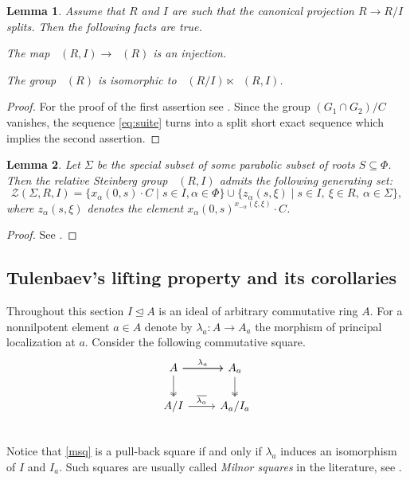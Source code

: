 \documentclass[oneside,12pt]{amsart}
\numberwithin{equation}{section}
\newtheorem{lem}{Lemma}
\numberwithin{lem}{section}
\theoremstyle{definition}
\theoremstyle{remark}
\DeclareMathOperator{\St}{St^G}
\begin{document}
\begin{lem}
 Assume that $R$ and $I$ are such that the canonical projection $ R \to R/I $ splits.
 Then the following facts are true.
 \begin{lemlist}
   \item \label{item:st-inj} The map $\St(R, I) \rightarrow \St(R)$ is an injection.
   \item \label{item:st-semi} The group $\St(R)$ is isomorphic to $\St(R/I) \ltimes \St(R, I)$.
 \end{lemlist}
\end{lem}
\begin{proof}
 For the proof of the first assertion see \cite[Lemma~8]{S15}.
 Since the group $(G_1 \cap G_2)/C$ vanishes, the sequence \eqref{eq:suite} turns into a split short exact sequence which implies the second assertion.
\end{proof}

\begin{lem} \label{lem:Zgen}
 Let $\Sigma$ be the special subset of some parabolic subset of roots $S \subseteq \Phi$.
 Then the relative Steinberg group $\St(R, I)$ admits the following generating set:
 \[ \mathcal{Z}(\Sigma, R, I) =  \{ x_\alpha(0,s) \cdot C \mid s\in I, \alpha \in \Phi \} \cup \{ z_\alpha(s, \xi) \mid s\in I, \ \xi \in R, \ \alpha \in \Sigma\},\]
 where $z_\alpha(s, \xi)$ denotes the element $x_\alpha(0, s)^{x_{-\alpha}(\xi, \xi)} \cdot C$.
\end{lem}
\begin{proof}
 See \cite[Lemma~5]{S15}.
\end{proof}

\subsection{Tulenbaev's lifting property and its corollaries}
Throughout this section $I \trianglelefteq A$ is an ideal of arbitrary commutative ring $A$.
For a nonnilpotent element $a \in A$ denote by $\lambda_a\colon A \rightarrow A_a$ the morphism of principal localization at $a$.
Consider the following commutative square.
\begin{equation} \label{msq}
 \begin{tikzcd}
    A \ar[r, "\lambda_a"] \ar[d, twoheadrightarrow] \ar[r] & A_a \ar[d, twoheadrightarrow] \\
    A/I \ar[r, "\overline{\lambda_a}"]& A_a/I_a\\
   \end{tikzcd}
\end{equation}
Notice that \eqref{msq} is a pull-back square if and only if $\lambda_a$ induces an isomorphism of $I$ and $I_a$.
Such squares are usually called \emph{Milnor squares} in the literature, see \cite[Ch.~I, \S~2]{Kbook}.
\end{document}
